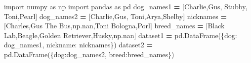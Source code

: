 \documentclass[
  12pt,
  krantz2]{krantz}
\makeatletter
\newenvironment{Shaded}{\begin{snugshade}}{\end{snugshade}}
\newcommand{\ImportTok}[1]{#1}
\newcommand{\NormalTok}[1]{#1}
\newcommand{\OperatorTok}[1]{\textcolor[rgb]{0.43,0.43,0.43}{\textbf{#1}}}
\newcommand{\StringTok}[1]{\textcolor[rgb]{0.5,0.5,0.5}{#1}}
\newenvironment{kframe}{%
\medskip{}
\setlength{\fboxsep}{.8em}
 \def\at@end@of@kframe{}%
 \ifinner\ifhmode%
  \def\at@end@of@kframe{\end{minipage}}%
  \begin{minipage}{\columnwidth}%
 \fi\fi%
 \def\FrameCommand##1{\hskip\@totalleftmargin \hskip-\fboxsep
 \colorbox{shadecolor}{##1}\hskip-\fboxsep
     \hskip-\linewidth \hskip-\@totalleftmargin \hskip\columnwidth}%
 \MakeFramed {\advance\hsize-\width
   \@totalleftmargin\z@ \linewidth\hsize
   \@setminipage}}%
 {\par\unskip\endMakeFramed%
 \at@end@of@kframe}
\renewenvironment{Shaded}{\begin{kframe}}{\end{kframe}}
\makeatother
\begin{document}
\begin{Shaded}
\begin{Highlighting}[]
\ImportTok{import}\NormalTok{ numpy }\ImportTok{as}\NormalTok{ np}
\ImportTok{import}\NormalTok{ pandas }\ImportTok{as}\NormalTok{ pd}
\NormalTok{dog\_names1 }\OperatorTok{=}\NormalTok{ [}\StringTok{\textquotesingle{}Charlie\textquotesingle{}}\NormalTok{,}\StringTok{\textquotesingle{}Gus\textquotesingle{}}\NormalTok{, }\StringTok{\textquotesingle{}Stubby\textquotesingle{}}\NormalTok{, }\StringTok{\textquotesingle{}Toni\textquotesingle{}}\NormalTok{,}\StringTok{\textquotesingle{}Pearl\textquotesingle{}}\NormalTok{]}
\NormalTok{dog\_names2 }\OperatorTok{=}\NormalTok{ [}\StringTok{\textquotesingle{}Charlie\textquotesingle{}}\NormalTok{,}\StringTok{\textquotesingle{}Gus\textquotesingle{}}\NormalTok{, }\StringTok{\textquotesingle{}Toni\textquotesingle{}}\NormalTok{,}\StringTok{\textquotesingle{}Arya\textquotesingle{}}\NormalTok{,}\StringTok{\textquotesingle{}Shelby\textquotesingle{}}\NormalTok{]}
\NormalTok{nicknames }\OperatorTok{=}\NormalTok{ [}\StringTok{\textquotesingle{}Charles\textquotesingle{}}\NormalTok{,}\StringTok{\textquotesingle{}Gus The Bus\textquotesingle{}}\NormalTok{,np.nan,}\StringTok{\textquotesingle{}Toni Bologna\textquotesingle{}}\NormalTok{,}\StringTok{\textquotesingle{}Porl\textquotesingle{}}\NormalTok{]}
\NormalTok{breed\_names }\OperatorTok{=}\NormalTok{ [}\StringTok{\textquotesingle{}Black Lab\textquotesingle{}}\NormalTok{,}\StringTok{\textquotesingle{}Beagle\textquotesingle{}}\NormalTok{,}\StringTok{\textquotesingle{}Golden Retriever\textquotesingle{}}\NormalTok{,}\StringTok{\textquotesingle{}Husky\textquotesingle{}}\NormalTok{,np.nan]}
\NormalTok{dataset1 }\OperatorTok{=}\NormalTok{ pd.DataFrame(\{}\StringTok{\textquotesingle{}dog\textquotesingle{}}\NormalTok{: dog\_names1,}
                        \StringTok{\textquotesingle{}nickname\textquotesingle{}}\NormalTok{: nicknames\})}
\NormalTok{dataset2 }\OperatorTok{=}\NormalTok{ pd.DataFrame(\{}\StringTok{\textquotesingle{}dog\textquotesingle{}}\NormalTok{:dog\_names2,}
                        \StringTok{\textquotesingle{}breed\textquotesingle{}}\NormalTok{:breed\_names\})}
\end{Highlighting}
\end{Shaded}
\end{document}
